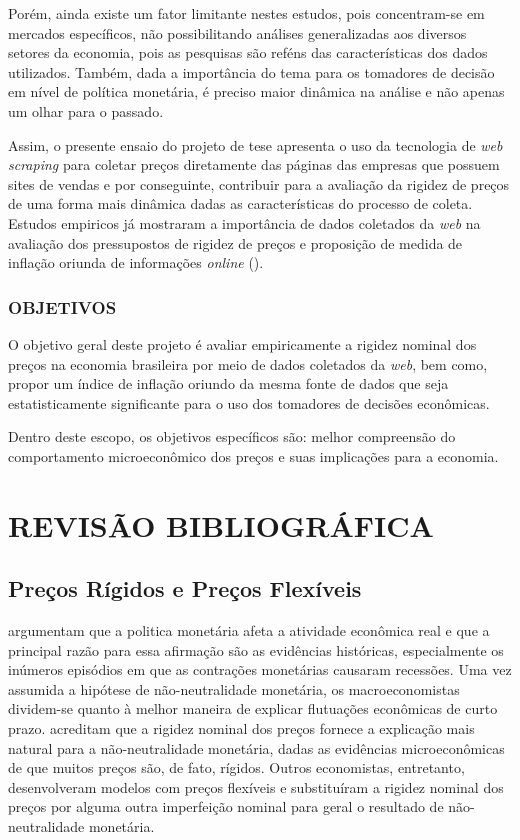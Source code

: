 \documentclass[twoside,a4paper,11pt]{report}
\begin{document}
Porém, ainda existe um fator limitante nestes estudos, pois concentram-se em mercados específicos, não possibilitando análises generalizadas aos diversos setores da economia, pois as pesquisas são reféns das características dos dados utilizados. Também, dada a importância do tema para os tomadores de decisão em nível de política monetária, é preciso maior dinâmica na análise e não apenas um olhar para o passado. 

Assim, o presente ensaio do projeto de tese apresenta o uso da tecnologia de \emph{web scraping} para coletar preços diretamente das páginas das empresas que possuem sites de vendas e por conseguinte, contribuir para a avaliação da rigidez de preços de uma forma mais dinâmica dadas as características do processo de coleta. Estudos empiricos já mostraram a importância de dados coletados da \emph{web} na avaliação dos pressupostos de rigidez de preços e proposição de medida de inflação oriunda de informações \emph{online} (\citet{cavallo2010scraped}).

\subsection*{OBJETIVOS}

O objetivo geral deste projeto é avaliar empiricamente a rigidez nominal dos preços na economia brasileira por meio de dados coletados da \emph{web}, bem como, propor um índice de inflação oriundo da mesma fonte de dados que seja estatisticamente significante para o uso dos tomadores de decisões econômicas.

Dentro deste escopo, os objetivos específicos são: melhor compreensão do comportamento microeconômico dos preços e suas implicações para a economia. 

\pagestyle{empty}
\cleardoublepage
\pagestyle{fancy}

\chapter{REVISÃO BIBLIOGRÁFICA}\label{cap2}

\section*{Preços Rígidos e Preços Flexíveis}

\citet{ball1994sticky} argumentam que a politica monetária afeta a atividade econômica real e que a principal razão para essa afirmação são as evidências históricas, especialmente os inúmeros episódios em que as contrações monetárias causaram recessões. Uma vez assumida a hipótese de não-neutralidade monetária, os macroeconomistas dividem-se quanto à melhor maneira de explicar flutuações econômicas de curto prazo. \citet{ball1994sticky} acreditam que a rigidez nominal dos preços fornece a explicação mais natural para a não-neutralidade monetária, dadas as evidências microeconômicas de que muitos preços são, de fato, rígidos. Outros economistas, entretanto, desenvolveram modelos com preços flexíveis e substituíram a rigidez nominal dos preços por alguma outra imperfeição nominal para geral o resultado de não-neutralidade monetária. 
\end{document}
